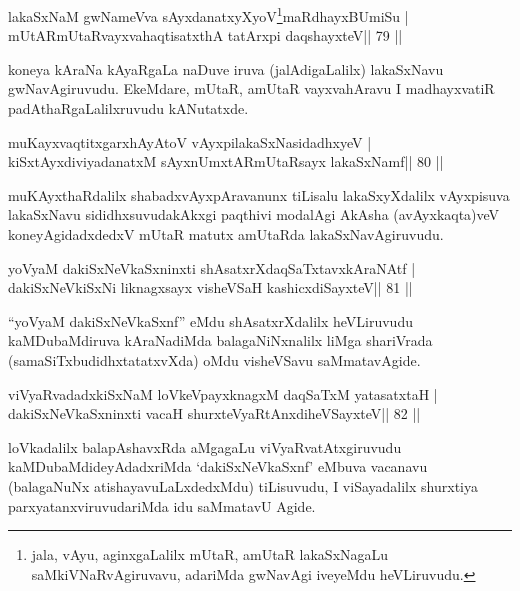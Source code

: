 \begin{shl}
lakaSxNaM gwNameVva sAyxdanatxyXyoV\footnote{jala, vAyu, aginxgaLalilx mUtaR, amUtaR lakaSxNagaLu saMkiVNaRvAgiruvavu, adariMda gwNavAgi iveyeMdu heVLiruvudu.}maRdhayxBUmiSu |
mUtARmUtaRvayxvahaqtisatxthA tatArxpi daqshayxteV\hfill || 79 ||
\end{shl}

\begin{artha}
koneya kAraNa kAyaRgaLa naDuve iruva (jalAdigaLalilx) lakaSxNavu gwNavAgiruvudu. EkeMdare, mUtaR, amUtaR vayxvahAravu I madhayxvatiR padAthaRgaLalilxruvudu kANutatxde.
\end{artha}


\begin{shl}
muKayxvaqtitxgarxhAyAtoV vAyxpilakaSxNasidadhxyeV |
kiSxtAyxdiviyadanatxM sAyxnUmxtARmUtaRsayx lakaSxNamf\hfill || 80 ||
\end{shl}

\begin{artha}
muKAyxthaRdalilx shabadxvAyxpAravanunx tiLisalu lakaSxyXdalilx vAyxpisuva lakaSxNavu sididhxsuvudakAkxgi paqthivi modalAgi AkAsha (avAyxkaqta)veV koneyAgidadxdedxV mUtaR matutx amUtaRda lakaSxNavAgiruvudu.
\end{artha}



\begin{shl}
yoV\s yaM dakiSxNeV\s kaSxninxti shAsatxrXdaqSaTxtavxkAraNAtf |
dakiSxNeV\s kiSxNi liknagxsayx visheVSaH kashicxdiSayxteV\hfill || 81 ||
\end{shl}

\begin{artha}
``yoV\s yaM dakiSxNeV\s kaSxnf'' eMdu shAsatxrXdalilx heVLiruvudu kaMDubaMdiruva kAraNadiMda balagaNiNxnalilx liMga shariVrada   (samaSiTxbudidhxtatatxvXda) oMdu visheVSavu saMmatavAgide.
\end{artha}



\begin{shl}
viVyaRvadadxkiSxNaM loVkeV\s payxknagxM daqSaTxM yatasatxtaH |
dakiSxNeV\s kaSxninxti vacaH shurxteVyaRtAnxdiheVSayxteV\hfill || 82 ||
\end{shl}

\begin{artha}
loVkadalilx balapAshavxRda aMgagaLu viVyaRvatAtxgiruvudu kaMDubaMdideyAdadxriMda `dakiSxNeV\s kaSxnf' eMbuva vacanavu (balagaNuNx atishayavuLaLxdedxMdu) tiLisuvudu, I viSayadalilx shurxtiya parxyatanxviruvudariMda idu saMmatavU Agide.
\end{artha}


